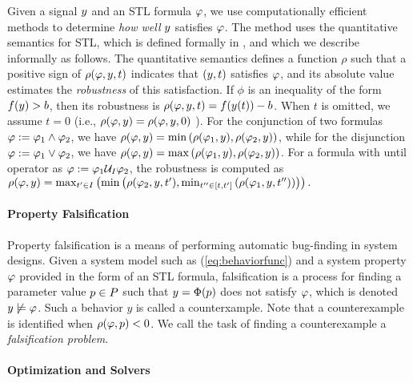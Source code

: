 Given a signal $y$ and an STL formula $\varphi$, we use computationally efficient methods to determine \emph{how well} $y$ satisfies $\varphi$.
The method uses the quantitative semantics for STL, which 
is defined formally in \cite{DonzeM10}, and which we describe informally as follows. The
quantitative semantics defines a function $\rho$ such that a positive sign of
$\rho(\varphi,y,t)$ indicates that $(y,t)$ satisfies
$\varphi$, and its absolute value estimates the \emph{robustness} of
this satisfaction. If $\phi$ is an inequality of the form
$f(y)>b$, then its robustness is $\rho(\varphi,y,t) = f(y(t))-b$.  
When $t$ is omitted, we assume $t=0$ (i.e., $\rho(\varphi,y)=\rho(\varphi,y,0)$ ).
For the conjunction of two
formulas $\varphi := \varphi_1 \wedge \varphi_2$, we have
$\rho(\varphi,y)=\min \left( \rho(\varphi_1,y),\rho(\varphi_2,y)\right)$,
while for the disjunction $\varphi := \varphi_1 \vee \varphi_2$, we have
$\rho(\varphi,y)=\max\left(\rho(\varphi_1,y),\rho(\varphi_2,y)\right)$.
For a formula with until operator as $\varphi := \varphi_1 \mathcal{U}_I \varphi_2$,
the robustness is computed as $\rho(\varphi,y) = \max_{t^\prime\in
  I}\left(\min\left(\rho(\varphi_2,y,t^\prime),\min_{t^{\prime\prime}\in
  [t,t^\prime]}\left(\rho(\varphi_1,y,t^{\prime\prime})\right)\right)\right).$

\paragraph{Property Falsification}	

Property falsification is a means of performing automatic bug-finding in system designs.
Given a system model such as (\ref{eq:behaviorfunc}) and a system property $\varphi$ provided in the form of an STL formula, 
falsification is a process for finding a parameter value $p \in P$
such that $y=\Phi(p)$ does not satisfy $\varphi$, which is denoted $y
\not\models \varphi$. Such a behavior $y$ is called a counterxample. 
Note that a counterexample is identified when 
$\rho(\varphi,p)<0$. We call the task of finding a counterexample 
a {\em falsification problem}. 

\paragraph{Optimization and Solvers}	

